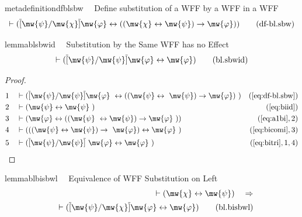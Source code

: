 \begin{restatable}{metadefinition}{dfblsbw}~~ Define substitution of a WFF by a WFF
in a WFF
\begin{align}
\vdash ( \overline{[} \mw{\psi} / \mw{\chi} \overline{]} \mw{\varphi}
    \leftrightarrow ( ( \mw{\chi} \leftrightarrow \mw{\psi} ) \rightarrow
    \mw{\varphi} ) )\label{eq:df-bl.sbw}\tag{df-bl.sbw}
\end{align}
\end{restatable}

\begin{restatable}{lemma}{blsbwid}~~ Substitution by the Same WFF has no Effect
\begin{align}
\vdash ( \overline{[} \mw{\psi} / \mw{\psi} \overline{]} \mw{\varphi}
    \leftrightarrow \mw{\varphi} )\label{eq:bl.sbwid}\tag{bl.sbwid}
\end{align}
\end{restatable}

\begin{proof}
\begin{align}
  1 &&  & \vdash ( \overline{[} \mw{\psi} / \mw{\psi} \overline{]} \mw{\varphi}
     ~\leftrightarrow ( ( \mw{\psi} \leftrightarrow
     ~\mw{\psi} ) \rightarrow \mw{\varphi} )
     ~)&(\mbox{\ref{eq:df-bl.sbw}})\notag
  \\ 2 &&  & \vdash ( \mw{\psi} \leftrightarrow \mw{\psi}
     ~)&(\mbox{\ref{eq:biid}})\notag
  \\ 3 &&  & \vdash ( \mw{\varphi} \leftrightarrow ( ( \mw{\psi}
     ~\leftrightarrow \mw{\psi} ) \rightarrow \mw{\varphi}
     ~) )&(\mbox{\ref{eq:a1bi}},2)\notag
  \\ 4 &&  & \vdash ( ( ( \mw{\psi} \leftrightarrow \mw{\psi} ) \rightarrow
     ~\mw{\varphi} ) \leftrightarrow \mw{\varphi}
     ~)&(\mbox{\ref{eq:bicomi}},3)\notag
  \\ 5 &&  & \vdash ( \overline{[} \mw{\psi} / \mw{\psi} \overline{]}
     ~\mw{\varphi} \leftrightarrow \mw{\varphi}
     ~)&(\mbox{\ref{eq:bitri}},1,4)\notag
\end{align}
\end{proof}

\begin{restatable}{lemma}{blbisbwl}~~ Equivalence of WFF Substitution on Left
\begin{align}
\vdash ( \mw{\chi} \leftrightarrow \mw{\psi} )\quad\Rightarrow \notag \\ 
	\quad \vdash (
    \overline{[} \mw{\psi} / \mw{\chi} \overline{]} \mw{\varphi}
    \leftrightarrow \mw{\varphi} )\label{eq:bl.bisbwl}\tag{bl.bisbwl}
\end{align}
\end{restatable}

